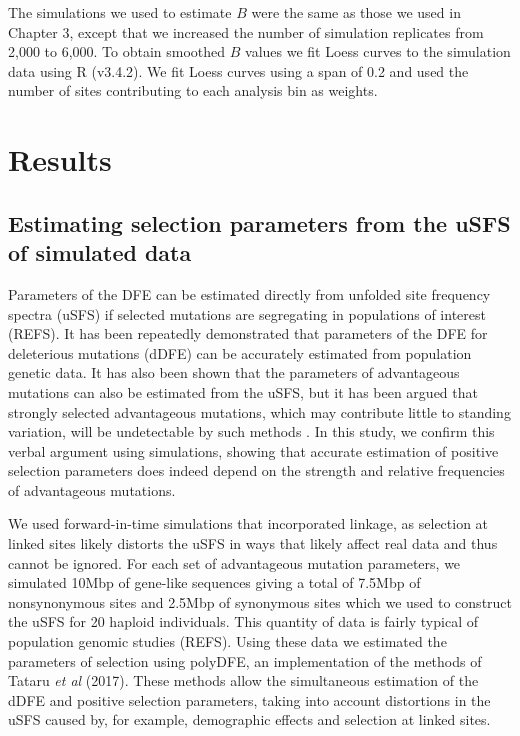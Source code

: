\documentclass[11pt]{article}
\begin{document}
 	The simulations we used to estimate $B$ were the same as those we used in Chapter 3, except that we increased the number of simulation replicates from 2,000 to 6,000. To obtain smoothed $B$ values we fit Loess curves to the simulation data using R (v3.4.2). We fit Loess curves using a span of 0.2 and used the number of sites contributing to each analysis bin as weights.

%
%

\section*{Results}

\subsection*{Estimating selection parameters from the uSFS of simulated data}

	Parameters of the DFE can be estimated directly from unfolded site frequency spectra (uSFS) if selected mutations are segregating in populations of interest (REFS). It has been repeatedly demonstrated that parameters of the DFE for deleterious mutations (dDFE) can be accurately estimated from population genetic data. It has also been shown that the parameters of advantageous mutations can also be estimated from the uSFS, but it has been argued that strongly selected advantageous mutations, which may contribute little to standing variation, will be undetectable by such methods \citep{RN323}. In this study, we confirm this verbal argument using simulations, showing that accurate estimation of positive selection parameters does indeed depend on the strength and relative frequencies of advantageous mutations.
	
	We used forward-in-time simulations that incorporated linkage, as selection at linked sites likely distorts the uSFS in ways that likely affect real data and thus cannot be ignored. For each set of advantageous mutation parameters, we simulated 10Mbp of gene-like sequences giving a total of 7.5Mbp of nonsynonymous sites and 2.5Mbp of synonymous sites which we used to construct the uSFS for 20 haploid individuals. This quantity of data is fairly typical of population genomic studies (REFS). Using these data we estimated the parameters of selection using polyDFE, an implementation of the methods of Tataru \textit{et al} (2017). These methods allow the simultaneous estimation of the dDFE and positive selection parameters, taking into account distortions in the uSFS caused by, for example, demographic effects and selection at linked sites. 
\end{document}
